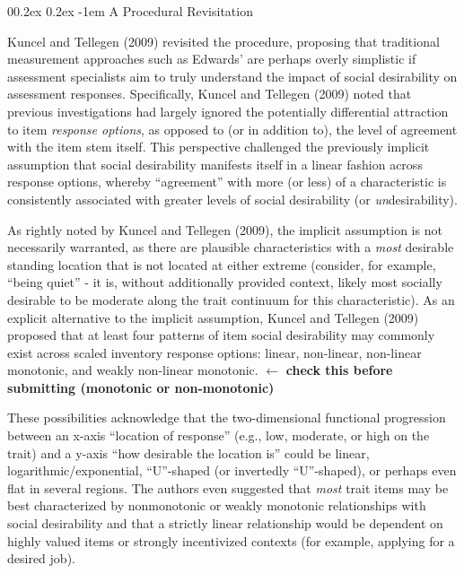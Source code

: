\documentclass[
  ,jou]{apa6}
\makeatletter
\let\oldparagraph\paragraph
\renewcommand{\paragraph}[1]{\oldparagraph{#1}\mbox{}}
\renewcommand{\paragraph}{\@startsection{paragraph}{4}{\parindent}%
  {0\baselineskip \@plus 0.2ex \@minus 0.2ex}%
  {-1em}%
  {\normalfont\normalsize\bfseries\itshape\typesectitle}}
\makeatother
\begin{document}
\hypertarget{a-procedural-revisitation}{%
\paragraph{A Procedural Revisitation}\label{a-procedural-revisitation}}

Kuncel and Tellegen (2009) revisited the procedure, proposing that traditional measurement approaches such as Edwards' are perhaps overly simplistic if assessment specialists aim to truly understand the impact of social desirability on assessment responses. Specifically, Kuncel and Tellegen (2009) noted that previous investigations had largely ignored the potentially differential attraction to item \emph{response options}, as opposed to (or in addition to), the level of agreement with the item stem itself. This perspective challenged the previously implicit assumption that social desirability manifests itself in a linear fashion across response options, whereby ``agreement'' with more (or less) of a characteristic is consistently associated with greater levels of social desirability (or \emph{un}desirability).

As rightly noted by Kuncel and Tellegen (2009), the implicit assumption is not necessarily warranted, as there are plausible characteristics with a \emph{most} desirable standing location that is not located at either extreme (consider, for example, ``being quiet'' - it is, without additionally provided context, likely most socially desirable to be moderate along the trait continuum for this characteristic). As an explicit alternative to the implicit assumption, Kuncel and Tellegen (2009) proposed that at least four patterns of item social desirability may commonly exist across scaled inventory response options: linear, non-linear, non-linear monotonic, and weakly non-linear monotonic. \(\leftarrow\) \textbf{check this before submitting (monotonic or non-monotonic)}

These possibilities acknowledge that the two-dimensional functional progression between an x-axis ``location of response'' (e.g., low, moderate, or high on the trait) and a y-axis ``how desirable the location is'' could be linear, logarithmic/exponential, ``U''-shaped (or invertedly ``U''-shaped), or perhaps even flat in several regions. The authors even suggested that \emph{most} trait items may be best characterized by nonmonotonic or weakly monotonic relationships with social desirability and that a strictly linear relationship would be dependent on highly valued items or strongly incentivized contexts (for example, applying for a desired job).
\end{document}
